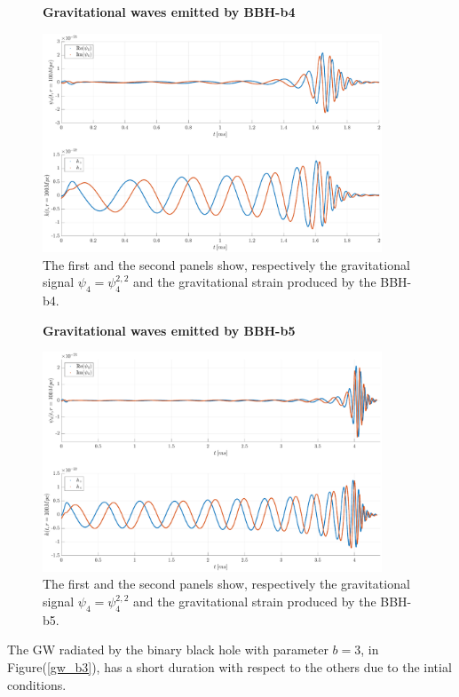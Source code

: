 \begin{figure}[H]
\centering
    \textbf{Gravitational waves emitted by BBH-b4}\par\medskip
\centering
   \includegraphics[width=0.9\textwidth]{numerical_evolution/gw_b4.eps}
   \caption{The first and the second panels show, respectively the gravitational signal $\psi_4=\psi_4 ^{2,2}$ and the gravitational strain produced by the BBH-b4.}
\label{gw_b4} 
\end{figure}
   \begin{figure}[h!]
\centering
    \textbf{Gravitational waves emitted by BBH-b5}\par\medskip
\centering
\includegraphics[width=0.9\textwidth]{numerical_evolution/gw_b5.eps}
   \caption{The first and the second panels show, respectively the gravitational signal $\psi_4=\psi_4 ^{2,2}$ and the gravitational strain produced by the BBH-b5.}
\label{gw_b5}
\end{figure}
The GW radiated by the binary black hole with parameter $b=3$, in Figure(\ref{gw_b3}), has a short duration with respect to the others due to the intial conditions.
